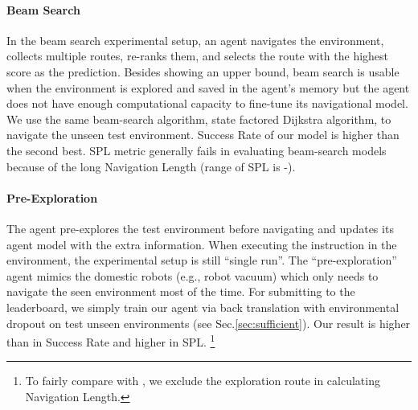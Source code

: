 \documentclass[11pt,a4paper]{article}
\begin{document}
\paragraph{Beam Search}
In the beam search experimental setup, 
an agent navigates the environment, collects multiple routes, re-ranks them, and selects the route with the highest score as the prediction.
Besides showing an upper bound,
beam search is usable when the environment is explored and saved in the agent's memory but the agent does not have enough computational capacity to fine-tune its navigational model. 
We use the same beam-search algorithm, state factored Dijkstra algorithm, to navigate the unseen test environment. 
Success Rate of our model is  higher than the second best.
SPL metric generally fails in evaluating beam-search models because of the long Navigation Length (range of SPL is -).

\paragraph{Pre-Exploration}
The agent pre-explores the test environment before navigating and updates its agent model with the extra information.
When executing the instruction in the environment, the experimental setup is still ``single run''.
The ``pre-exploration'' agent mimics the domestic robots (e.g., robot vacuum) which only needs to navigate the seen environment most of the time.
For submitting to the leaderboard, we simply train our agent via back translation with environmental dropout on test unseen environments (see Sec.\ref{sec:sufficient}).
Our result is  higher than  in Success Rate and  higher in SPL.
\footnote{To fairly compare with , we exclude the exploration route in calculating Navigation Length.}
\end{document}
